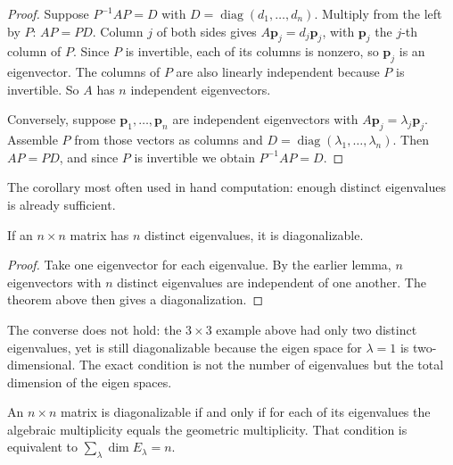 \begin{proof}
Suppose $P^{-1}AP=D$ with $D=\operatorname{diag}(d_{1},\dots,d_{n})$. Multiply from the left by
$P$: $AP=PD$. Column $j$ of both sides gives
$A\mathbf{p}_{j}=d_{j}\mathbf{p}_{j}$, with $\mathbf{p}_{j}$ the $j$-th column of $P$. Since $P$ is
invertible, each of its columns is nonzero, so $\mathbf{p}_{j}$ is an eigenvector. The columns of
$P$ are also linearly independent because $P$ is invertible. So $A$ has $n$ independent
eigenvectors.

Conversely, suppose $\mathbf{p}_{1},\dots,\mathbf{p}_{n}$ are independent eigenvectors with
$A\mathbf{p}_{j}=\lambda_{j}\mathbf{p}_{j}$. Assemble $P$ from those vectors as columns and
$D=\operatorname{diag}(\lambda_{1},\dots,\lambda_{n})$. Then $AP=PD$, and since $P$ is invertible
we obtain $P^{-1}AP=D$.
\end{proof}

The corollary most often used in hand computation: enough distinct eigenvalues is already
sufficient.

\begin{akibat}
If an $n\times n$ matrix has $n$ distinct eigenvalues, it is diagonalizable.
\end{akibat}

\begin{proof}
Take one eigenvector for each eigenvalue. By the earlier lemma, $n$ eigenvectors with $n$ distinct
eigenvalues are independent of one another. The theorem above then gives a diagonalization.
\end{proof}

The converse does not hold: the $3\times3$ example above had only two distinct eigenvalues, yet is
still diagonalizable because the eigen space for $\lambda=1$ is two-dimensional. The exact
condition is not the number of eigenvalues but the total dimension of the eigen spaces.

\begin{teorema}
An $n\times n$ matrix is diagonalizable if and only if for each of its eigenvalues the algebraic
multiplicity equals the geometric multiplicity. That condition is equivalent to
$\sum_{\lambda}\dim E_{\lambda}=n$.
\end{teorema}

